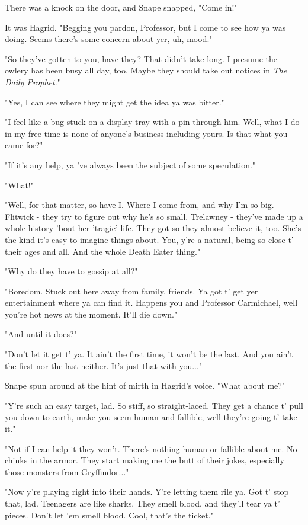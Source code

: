 \documentclass[a4paper,11pt]{article}
\begin{document}
There was a knock on the door, and Snape snapped, "Come in!"

It was Hagrid. "Begging you pardon, Professor, but I come to see how ya was doing. Seems there's some concern about yer, uh, mood."

"So they've gotten to you, have they? That didn't take long. I presume the owlery has been busy all day, too. Maybe they should take out notices in \emph{The Daily Prophet}."

"Yes, I can see where they might get the idea ya was bitter."

"I feel like a bug stuck on a display tray with a pin through him. Well, what I do in my free time is none of anyone's business including yours. Is that what you came for?"

"If it's any help, ya 've always been the subject of some speculation."

"What!"

"Well, for that matter, so have I. Where I come from, and why I'm so big. Flitwick - they try to figure out why he's so small. Trelawney - they've made up a whole history 'bout her 'tragic' life. They got so they almost believe it, too. She's the kind it's easy to imagine things about. You, y're a natural, being so close t' their ages and all. And the whole Death Eater thing."

"Why do they have to gossip at all?"

"Boredom. Stuck out here away from family, friends. Ya got t' get yer entertainment where ya can find it. Happens you and Professor Carmichael, well you're hot news at the moment. It'll die down."

"And until it does?"

"Don't let it get t' ya. It ain't the first time, it won't be the last. And you ain't the first nor the last neither. It's just that with you..."

Snape spun around at the hint of mirth in Hagrid's voice. "What about me?"

"Y're such an easy target, lad. So stiff, so straight-laced. They get a chance t' pull you down to earth, make you seem human and fallible, well they're going t' take it."

"Not if I can help it they won't. There's nothing human or fallible about me. No chinks in the armor. They start making me the butt of their jokes, especially those monsters from Gryffindor..."

"Now y're playing right into their hands. Y're letting them rile ya. Got t' stop that, lad. Teenagers are like sharks. They smell blood, and they'll tear ya t' pieces. Don't let 'em smell blood. Cool, that's the ticket."
\end{document}
